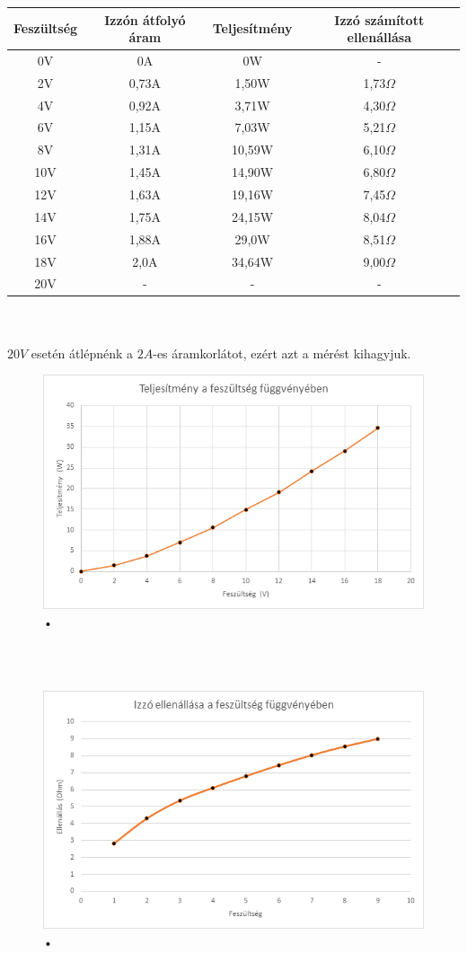 \documentclass[10pt,a4paper]{article}
\begin{document}
\begin{tabular}{|c|c|c|c|}
\hline 
Feszültség & Izzón átfolyó áram & Teljesítmény & Izzó számított ellenállása \\ 
\hline 
0V & 0A & 0W & - \\ 
\hline 
2V & 0,73A & 1,50W & 1,73$\Omega$ \\ 
\hline 
4V & 0,92A & 3,71W & 4,30$\Omega$ \\ 
\hline 
6V & 1,15A & 7,03W & 5,21$\Omega$ \\ 
\hline 
8V & 1,31A & 10,59W & 6,10$\Omega$ \\ 
\hline 
10V & 1,45A & 14,90W & 6,80$\Omega$ \\ 
\hline 
12V & 1,63A & 19,16W & 7,45$\Omega$ \\ 
\hline 
14V & 1,75A & 24,15W & 8,04$\Omega$ \\ 
\hline 
16V & 1,88A & 29,0W & 8,51$\Omega$ \\ 
\hline 
18V & 2,0A & 34,64W & 9,00$\Omega$ \\ 
\hline 
20V & - & - & - \\ 
\hline 
\end{tabular} \\\\
$20V$ esetén átlépnénk a $2A$-es áramkorlátot, ezért azt a mérést kihagyjuk.	
\begin{figure}[hbtp]
			 \centering
			 \includegraphics[scale=0.7]{telj_fesz.png}
			 \caption{•}
			 \end{figure}\\\\
			 \begin{figure}[hbtp]
			 \centering
			 \includegraphics[scale=0.7]{ell_fesz.png}
			 \caption{•}
			 \end{figure}
\end{document}
